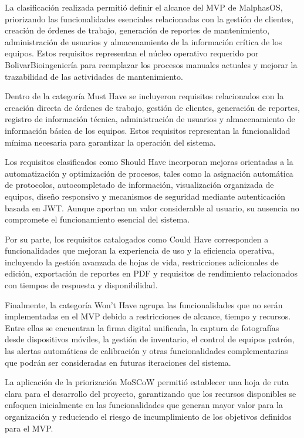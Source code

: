 \documentclass[12pt,a4paper]{article}
\begin{document}
La clasificación realizada permitió definir el alcance del MVP de MalphasOS, priorizando las funcionalidades esenciales relacionadas con la gestión de clientes, creación de órdenes de trabajo, generación de reportes de mantenimiento, administración de usuarios y almacenamiento de la información crítica de los equipos. Estos requisitos representan el núcleo operativo requerido por BolivarBioingeniería para reemplazar los procesos manuales actuales y mejorar la trazabilidad de las actividades de mantenimiento.

Dentro de la categoría Must Have se incluyeron requisitos relacionados con la creación directa de órdenes de trabajo, gestión de clientes, generación de reportes, registro de información técnica, administración de usuarios y almacenamiento de información básica de los equipos. Estos requisitos representan la funcionalidad mínima necesaria para garantizar la operación del sistema.

Los requisitos clasificados como Should Have incorporan mejoras orientadas a la automatización y optimización de procesos, tales como la asignación automática de protocolos, autocompletado de información, visualización organizada de equipos, diseño responsivo y mecanismos de seguridad mediante autenticación basada en JWT. Aunque aportan un valor considerable al usuario, su ausencia no compromete el funcionamiento esencial del sistema.

Por su parte, los requisitos catalogados como Could Have corresponden a funcionalidades que mejoran la experiencia de uso y la eficiencia operativa, incluyendo la gestión avanzada de hojas de vida, restricciones adicionales de edición, exportación de reportes en PDF y requisitos de rendimiento relacionados con tiempos de respuesta y disponibilidad.

Finalmente, la categoría Won't Have agrupa las funcionalidades que no serán implementadas en el MVP debido a restricciones de alcance, tiempo y recursos. Entre ellas se encuentran la firma digital unificada, la captura de fotografías desde dispositivos móviles, la gestión de inventario, el control de equipos patrón, las alertas automáticas de calibración y otras funcionalidades complementarias que podrán ser consideradas en futuras iteraciones del sistema.

La aplicación de la priorización MoSCoW permitió establecer una hoja de ruta clara para el desarrollo del proyecto, garantizando que los recursos disponibles se enfoquen inicialmente en las funcionalidades que generan mayor valor para la organización y reduciendo el riesgo de incumplimiento de los objetivos definidos para el MVP.
\end{document}
